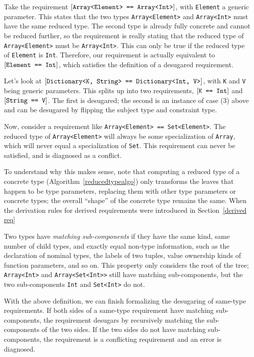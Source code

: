 \documentclass[../generics]{subfiles}
\begin{document}
\begin{example}\label{same-type desugaring example}
Take the requirement $[\texttt{Array<Element> == Array<Int>}]$, with \texttt{Element} a generic parameter. This states that the two types \texttt{Array<Element>} and \texttt{Array<Int>} must have the same reduced type. The second type is already fully concrete and cannot be reduced further, so the requirement is really stating that the reduced type of \texttt{Array<Element>} must be \texttt{Array<Int>}. This can only be true if the reduced type of \texttt{Element} is \texttt{Int}. Therefore, our requirement is actually equivalent to $[\texttt{Element == Int}]$, which satisfies the definition of a desugared requirement.
\end{example}
\begin{example}
Let's look at $[\texttt{Dictionary<K, String> == Dictionary<Int, V>}]$, with \texttt{K} and \texttt{V} being generic parameters. This splits up into two requirements, $[\texttt{K == Int}]$ and $[\texttt{String == V}]$. The first is desugared; the second is an instance of case (3) above and can be desugared by flipping the subject type and constraint type.
\end{example}
\begin{example}\label{conflicting requirement example}
Now, consider a requirement like \texttt{Array<Element> == Set<Element>}. The reduced type of \texttt{Array<Element>} will always be some specialization of \texttt{Array}, which will never equal a specialization of \texttt{Set}. This requirement can never be satisfied, and is diagnosed as a conflict.
\end{example}
To understand why this makes sense, note that computing a reduced type of a concrete type (Algorithm~\ref{reducedtypealgo}) only transforms the leaves that happen to be type parameters, replacing them with other type parameters or concrete types; the overall ``shape'' of the concrete type remains the same. When the derivation rules for derived requirements were introduced in Section~\ref{derived req}
\begin{definition}
%
Two types have \emph{matching sub-components} if they have the same kind, same number of child types, and exactly equal non-type information, such as the declaration of nominal types, the labels of two tuples, value ownership kinds of function parameters, and so on. This property only considers the root of the tree; \texttt{Array<Int>} and \texttt{Array<Set<Int>>} still have matching sub-components, but the two sub-components \texttt{Int} and \texttt{Set<Int>} do not.
\end{definition}
With the above definition, we can finish formalizing the desugaring of same-type requirements. If both sides of a same-type requirement have matching sub-components, the requirement desugars by recursively matching the sub-components of the two sides. If the two sides do not have matching sub-components, the requirement is a conflicting requirement and an error is diagnosed.
\end{document}
